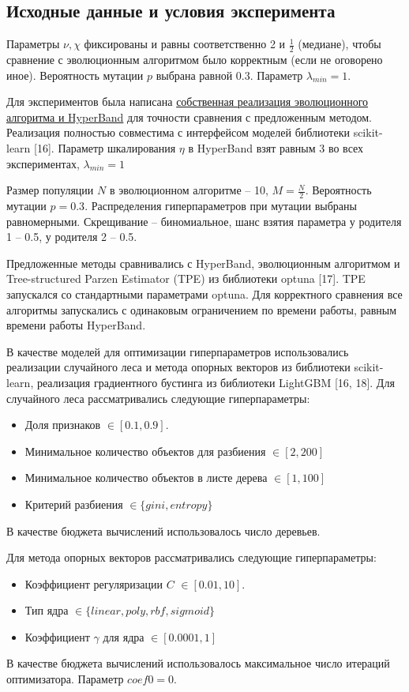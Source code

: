 \documentclass[a4paper,12pt]{article}
\begin{document}
\subsection{Исходные данные и условия эксперимента}
Параметры $\nu, \chi$ фиксированы и равны соответственно 2 и $\frac{1}{2}$ (медиане), чтобы сравнение с эволюционным алгоритмом было корректным (если не оговорено иное). Вероятность мутации $p$ выбрана равной 0.3. Параметр $\lambda_{min}=1$.

Для экспериментов была написана \href{https://github.com/AbVal/evohyperband/}{собственная реализация эволюционного алгоритма и HyperBand} для точности сравнения с предложенным методом. Реализация полностью совместима с интерфейсом моделей библиотеки scikit-learn [16]. Параметр шкалирования $\eta$ в HyperBand взят равным 3 во всех экспериментах, $\lambda_{min}=1$

Размер популяции $N$ в эволюционном алгоритме -- 10, $M = \frac{N}{2}$. Вероятность мутации $p=0.3$. Распределения гиперпараметров при мутации выбраны равномерными. Скрещивание -- биномиальное, шанс взятия параметра у родителя 1 -- 0.5, у родителя 2 -- 0.5.

Предложенные методы сравнивались с HyperBand, эволюционным алгоритмом и Tree-structured Parzen Estimator (TPE) из библиотеки optuna [17]. TPE запускался со стандартными параметрами optuna. Для корректного сравнения все алгоритмы запускались с одинаковым ограничением по времени работы, равным времени работы HyperBand.

В качестве моделей для оптимизации гиперпараметров использовались реализации случайного леса и метода опорных векторов из библиотеки scikit-learn, реализация градиентного бустинга из библиотеки LightGBM [16, 18].
Для случайного леса рассматривались следующие гиперпараметры:
\begin{itemize}
    \item Доля признаков $\in [0.1, 0.9].$
    \item Минимальное количество объектов для разбиения $\in [2, 200]$
    \item Минимальное количество объектов в листе дерева $\in [1, 100]$
    \item Критерий разбиения $\in \{gini, entropy\}$
\end{itemize}
В качестве бюджета вычислений использовалось число деревьев.

Для метода опорных векторов рассматривались следующие гиперпараметры:
\begin{itemize}
    \item Коэффициент регуляризации $C$ $\in [0.01, 10].$
    \item Тип ядра $\in \{linear, poly, rbf, sigmoid\}$
    \item Коэффициент $\gamma$ для ядра $\in [0.0001, 1]$
\end{itemize}
В качестве бюджета вычислений использовалось максимальное число итераций оптимизатора. Параметр $coef0=0$. 
\end{document}
